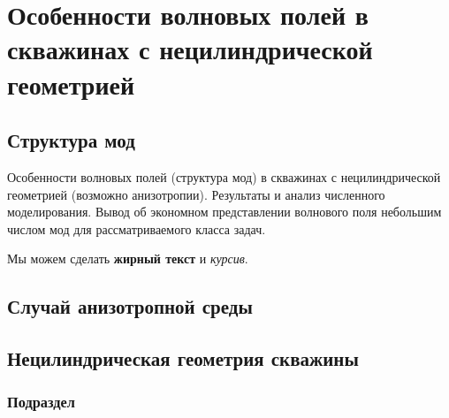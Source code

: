 \chapter{Особенности волновых полей в скважинах с нецилиндрической геометрией}\label{ch:ch_my_3}

\section{Структура мод}\label{sec:ch_my_3/sec1}

Особенности волновых полей (структура мод) в скважинах с нецилиндрической геометрией (возможно анизотропии). Результаты и анализ численного моделирования. Вывод об экономном представлении волнового поля небольшим числом мод для рассматриваемого класса задач.

Мы можем сделать \textbf{жирный текст} и \textit{курсив}.

\section{Случай анизотропной среды}\label{sec:ch_my_1/sec2}


\section{Нецилиндрическая геометрия скважины}\label{sec:ch_my_1/sec3}


\subsection{Подраздел}\label{subsec:ch_my_1/sec3/sub1}

